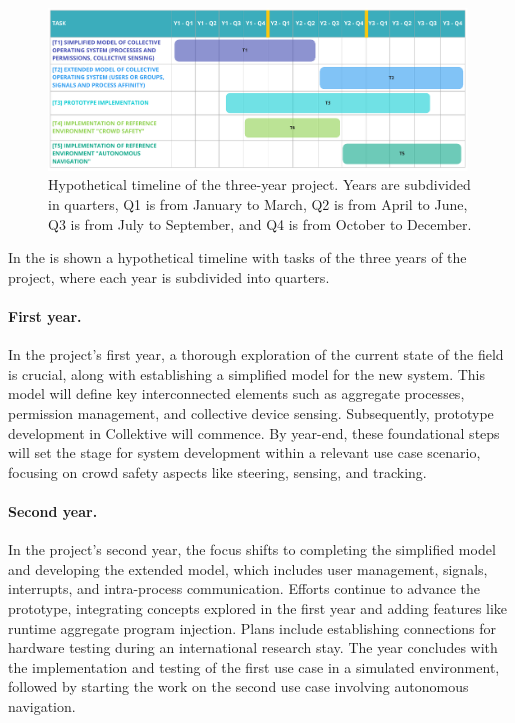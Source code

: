 \documentclass[12pt, a4paper]{article}
\begin{document}
\begin{figure}
    \centering
    \includegraphics[width=0.99\textwidth]{figures/timeline}
    \caption{Hypothetical timeline of the three-year project.
        Years are subdivided in quarters, Q1 is from January to March,
        Q2 is from April to June, Q3 is from July to September, and Q4 is from October to December.
    }\label{fig:timeline}
\end{figure}

In the  is shown a hypothetical timeline with tasks of the three years of the project,
where each year is subdivided into quarters.

\sloppypar
\paragraph{First year.}
In the project's first year,
a thorough exploration of the current state of the field is crucial,
along with establishing a simplified model for the new system.
%
This model will define key interconnected elements such as aggregate processes,
permission management, and collective device sensing.
%
Subsequently,
prototype development in Collektive will commence.
%
By year-end,
these foundational steps will set the stage for system development within a relevant use case scenario,
focusing on crowd safety aspects like steering, sensing, and tracking.

\sloppypar
\paragraph{Second year.}
In the project's second year,
the focus shifts to completing the simplified model and developing the extended model,
which includes user management, signals, interrupts, and intra-process communication.
%
Efforts continue to advance the prototype,
integrating concepts explored in the first year and adding features like runtime aggregate program injection.
%
Plans include establishing connections for hardware testing during an international research stay.
%
The year concludes with the implementation and testing of the first use case in a simulated environment,
followed by starting the work on the second use case involving autonomous navigation.
\end{document}
